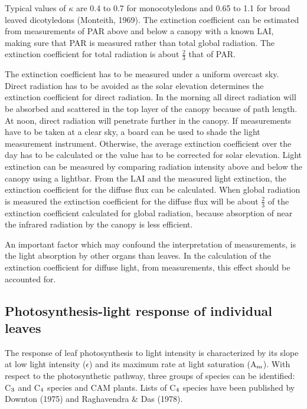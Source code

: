 Typical values of $\kappa$ are 0.4 to 0.7 for monocotyledons and 0.65 to 1.1 for broad leaved
dicotyledons (Monteith, 1969). The extinction coefficient can be estimated from 
measurements of PAR above and below a canopy with a known LAI, making sure that PAR is
measured rather than total global radiation. The extinction coefficient for total radiation is
about $\frac{2}{3}$ that of PAR. 

The extinction coefficient has to be measured under a uniform overcast sky. Direct
radiation has to be avoided as the solar elevation determines the extinction coefficient for
direct radiation. In the morning all direct radiation will be absorbed and scattered in the
top layer of the canopy because of path length. At noon, direct radiation will penetrate
further in the canopy. If measurements have to be taken at a clear sky, a board can be
used to shade the light measurement instrument. Otherwise, the average extinction
coefficient over the day has to be calculated or the value has to be corrected for solar
elevation. Light extinction can be measured by comparing radiation intensity above and
below the canopy using a lightbar. From the LAI and the measured light extinction, the
extinction coefficient for the diffuse flux can be calculated. When global radiation is
measured the extinction coefficient for the diffuse flux will be about $\frac{2}{3}$ of the extinction
coefficient calculated for global radiation, because absorption of near the infrared
radiation by the canopy is less efficient.

An important factor which may confound the interpretation of measurements, is the light
absorption by other organs than leaves. In the calculation of the extinction coefficient for
diffuse light, from measurements, this effect should be accounted for.

\subsection{Photosynthesis-light response of individual leaves} 

The response of leaf photosynthesis to light intensity is characterized by its slope at low
light intensity ($\epsilon$) and its maximum rate at light saturation (A$_{{\rm m}}$). With respect to the
photosynthetic pathway, three groups of species can be identified: C$_{{\rm 3}}$ and C$_{{\rm 4}}$ species and
CAM plants. Lists of C$_{{\rm 4}}$ species have been published by Downton (1975) and
Raghavendra \& Das (1978).   

